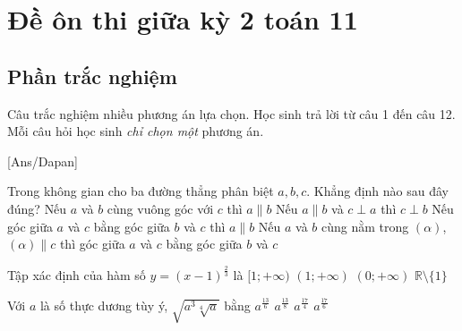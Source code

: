 \section{Đề ôn thi giữa kỳ 2 toán 11}
\subsection{Phần trắc nghiệm}
Câu trắc nghiệm nhiều phương án lựa chọn. Học sinh trả lời từ
câu 1 đến câu 12. Mỗi câu hỏi học sinh \textit{chỉ chọn một} phương án.

[Ans/Dapan]

\hienthiloigiaiex
\begin{ex}%
	Trong không gian cho ba đường thẳng phân biệt $a, b, c$. Khẳng định nào sau đây đúng?
	\choice
	{Nếu $a$ và $b$ cùng vuông góc với $c$ thì $a \parallel b$}
	{\True Nếu $a \parallel b$ và $c \perp a$ thì $c \perp b$}
	{Nếu góc giữa $a$ và $c$ bằng góc giữa $b$ và $c$ thì $a \parallel b$}
	{Nếu $a$ và $b$ cùng nằm trong $(\alpha)$, $(\alpha) \parallel c$ thì góc giữa $a$ và $c$ bằng góc giữa $b$ và $c$}
\end{ex}
\begin{ex}%
	Tập xác định của hàm số $y=(x-1)^{\tfrac{2}{3}}$ là
	\choice
	{$[1;+\infty)$}
	{\True $(1;+\infty)$}
	{$(0;+\infty)$}
	{$\mathbb{R} \setminus\{1\}$}
\end{ex}
\begin{ex}%
	Với $a$ là số thực dương tùy ý, $\sqrt{a^3 \sqrt[4]{a}}$ bằng
	\choice
	{$a^{\frac{13}{6}}$}
	{\True $a^{\frac{13}{8}}$}
	{$a^{\frac{17}{4}}$}
	{$a^{\frac{17}{6}}$}
\end{ex}
